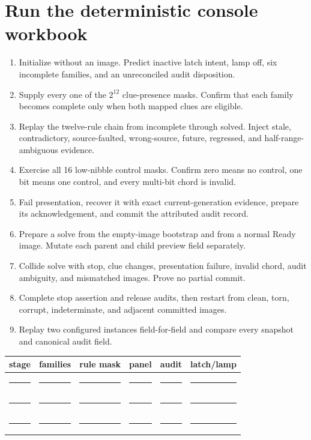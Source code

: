 \documentclass[10pt]{article}
\newcommand{\blankline}{\rule{0.72in}{0.4pt}}
\begin{document}
\section{Run the deterministic console workbook}
\begin{enumerate}
 \item Initialize without an image. Predict inactive latch intent, lamp off,
       six incomplete families, and an unreconciled audit disposition.
 \item Supply every one of the \(2^{12}\) clue-presence masks. Confirm that
       each family becomes complete only when both mapped clues are eligible.
 \item Replay the twelve-rule chain from incomplete through solved. Inject
       stale, contradictory, source-faulted, wrong-source, future, regressed,
       and half-range-ambiguous evidence.
 \item Exercise all 16 low-nibble control masks. Confirm zero means no control,
       one bit means one control, and every multi-bit chord is invalid.
 \item Fail presentation, recover it with exact current-generation evidence,
       prepare its acknowledgement, and commit the attributed audit record.
 \item Prepare a solve from the empty-image bootstrap and from a normal Ready
       image. Mutate each parent and child preview field separately.
 \item Collide solve with stop, clue changes, presentation failure, invalid
       chord, audit ambiguity, and mismatched images. Prove no partial commit.
 \item Complete stop assertion and release audits, then restart from clean,
       torn, corrupt, indeterminate, and adjacent committed images.
 \item Replay two configured instances field-for-field and compare every
       snapshot and canonical audit field.
\end{enumerate}

\begin{tabularx}{\linewidth}{@{}X X X X X X@{}}
\toprule
stage & families & rule mask & panel & audit & latch/lamp\\
\midrule
\rule{0pt}{16pt}\blankline & \blankline & \blankline & \blankline & \blankline & \blankline\\[8pt]
\blankline & \blankline & \blankline & \blankline & \blankline & \blankline\\[8pt]
\blankline & \blankline & \blankline & \blankline & \blankline & \blankline\\
\bottomrule
\end{tabularx}
\end{document}

